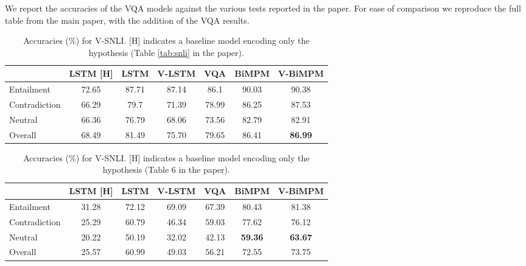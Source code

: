 \documentclass[11pt]{article}
\begin{document}
We report the accuracies of the VQA models against the various tests
reported in the paper. For ease of comparison we reproduce the full table from the main paper,
with the addition of the  VQA results.

\begin{table}[!ht]
	\begin{center}
		\begin{tabular}{|l|c||ccccc|}
			\hline
			& LSTM [H] & LSTM & V-LSTM &   VQA & BiMPM &V-BiMPM   \\\hline
			Entailment &  72.65 &87.71 & 87.14 & 86.1 & 90.03 & 90.38    \\
			Contradiction &  66.29 &79.7&  71.39   & 78.99& 86.25 &  87.53  \\
			Neutral & 66.36 & 76.79 &  68.06 &  73.56 & 82.79 & 82.91  \\\hline
			Overall & 68.49 & 81.49 &  75.70 &  79.65  & 86.41 & \textbf{86.99} \\
			\hline
		\end{tabular}
	\end{center}
	\caption{Accuracies (\%) for V-SNLI. [H] indicates a baseline model encoding only the hypothesis (Table \ref{tab:snli} in the paper).} \label{tab:snli-supp}
\end{table}



\begin{table}[!ht]
	\begin{center}
		\begin{tabular}{|l|c||ccccc|}
			\hline
			& LSTM [H] & LSTM  & V-LSTM  & VQA & BiMPM &V-BiMPM  \\\hline
			Entailment &  31.28 & 72.12&  69.09  & 67.39&   80.43 & 81.38 \\
			Contradiction & 25.29 & 60.79 &  46.34    & 59.03 & 77.62 & 76.12 \\
			Neutral & 20.22 & 50.19 &  32.02 &  42.13  & \textbf{59.36} & \textbf{63.67}\\\hline
			Overall & 25.57 & 60.99 &   49.03 &  56.21  & 72.55 & 73.75 \\
			\hline
		\end{tabular}
	\end{center}
	\caption{Accuracies (\%) for V-SNLI. [H] indicates a baseline model encoding only the hypothesis (Table 6 in the paper).} \label{tab:hard-supp}
\end{table}
\end{document}
